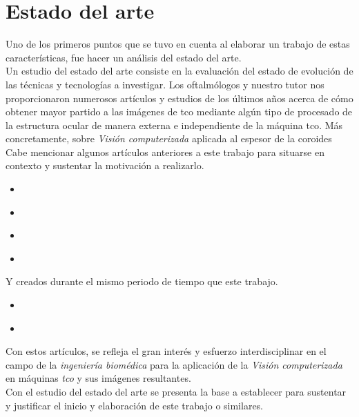 \chapter{Estado del arte}
Uno de los primeros puntos que se tuvo en cuenta al elaborar un
trabajo de estas características, fue hacer un análisis del estado del
arte.\\
Un estudio del estado del arte consiste en la evaluación del estado de
evolución de las técnicas y tecnologías a investigar. Los oftalmólogos
y nuestro tutor nos proporcionaron numerosos artículos y estudios de
los últimos años acerca de cómo obtener mayor partido a las imágenes
de \gls{tco} mediante algún tipo de procesado de la estructura ocular
de manera externa e independiente de la máquina \gls{tco}. Más
concretamente, sobre \emph{Visión computerizada} aplicada al espesor
de la \gls{coroides}\\
Cabe mencionar algunos artículos anteriores a este trabajo para
situarse en contexto y sustentar la motivación a realizarlo.
\begin{itemize}
\item \emph{\citep*[Automated choroidal segmentation of 1060 nm OCT in
    healthy and pathologic eyes using a statistical
    model]{kajic2012automated}}
\item \emph{\citep*[Automatic segmentation of the choroid in enhanced
    depth imaging optical coherence tomography
    images]{tian2013automatic}}
\item \emph{\citep*[Automatic segmentation of choroidal thickness in
    optical coherence tomography]{alonso2013automatic}}
\item \emph{\citep*[Segmentation of choroidal boundary in enhanced
    depth imaging OCTs using a multiresolution texture based modeling
    in graph cuts]{danesh2014segmentation}}
\end{itemize}
Y creados durante el mismo periodo de tiempo que este trabajo.
\begin{itemize}
\item \emph{\citep*[Evaluation of choroidal thickness via enhanced
    depth-imaging optical coherence tomography in patients with
    systemic hypertension]{gok2015evaluation}}
\item \emph{\citep*[Optical modelling of the human
    retina]{ara2015optical}}
\end{itemize}
Con estos artículos, se refleja el gran interés y esfuerzo
interdisciplinar en el campo de la \emph{ingeniería biomédica} para la
aplicación de la \emph{Visión computerizada} en máquinas
\emph{\gls{tco}} y sus imágenes resultantes.\\
Con el estudio del estado del arte se presenta la base a establecer
para sustentar y justificar el inicio y elaboración de este trabajo o
similares.

